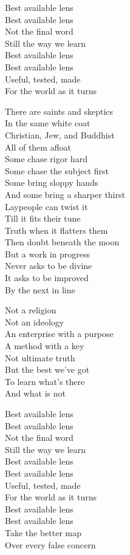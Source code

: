 \begin{lyrics}
Best available lens\\
Best available lens\\
Not the final word\\
Still the way we learn\\
Best available lens\\
Best available lens\\
Useful, tested, made\\
For the world as it turns

There are saints and skeptics\\
In the same white coat\\
Christian, Jew, and Buddhist\\
All of them afloat\\
Some chase rigor hard\\
Some chase the subject first\\
Some bring sloppy hands\\
And some bring a sharper thirst\\
Laypeople can twist it\\
Till it fits their tune\\
Truth when it flatters them\\
Then doubt beneath the moon\\
But a work in progress\\
Never asks to be divine\\
It asks to be improved\\
By the next in line

Not a religion\\
Not an ideology\\
An enterprise with a purpose\\
A method with a key\\
Not ultimate truth\\
But the best we’ve got\\
To learn what’s there\\
And what is not

Best available lens\\
Best available lens\\
Not the final word\\
Still the way we learn\\
Best available lens\\
Best available lens\\
Useful, tested, made\\
For the world as it turns\\
Best available lens\\
Best available lens\\
Take the better map\\
Over every false concern
\end{lyrics}

